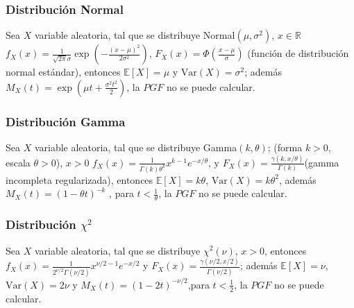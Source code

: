 \subsubsection{Distribuci\'on Normal}

\begin{Def} Sea $X$ variable aleatoria, tal que se distribuye Normal$(\mu,\sigma^{2})$,  $x \in \mathbb{R}$
$f_X(x) =\frac{1}{\sqrt{2\pi}\sigma}\exp\!\left(-\frac{(x-\mu)^{2}}{2\sigma^{2}}\right)$, $F_X(x) =\Phi\!\left(\frac{x-\mu}{\sigma}\right)$ (funci\'on de distribuci\'on normal est\'andar), entonces $\mathbb{E}[X] =\mu$ y $\mathrm{Var}(X) = \sigma^{2}$; adem\'as $M_X(t) = \exp\!\left(\mu t + \frac{\sigma^{2}t^{2}}{2}\right)$,  la $PGF$ no se puede calcular.
\end{Def}

\subsubsection{Distribuci\'on Gamma} 

\begin{Def} Sea $X$ variable aleatoria, tal que se distribuye Gamma$(k,\theta)$; (forma $k>0$, escala $\theta>0$), $x>0$
$f_X(x) = \frac{1}{\Gamma(k)\theta^{k}} x^{k-1} e^{-x/\theta}$, y $F_X(x) = \frac{\gamma\!\left(k, x/\theta\right)}{\Gamma(k)}$(gamma incompleta regularizada), entonces $\mathbb{E}[X] = k\theta$,  $ \mathrm{Var}(X) = k\theta^{2}$, adem\'as $M_X(t) = (1-\theta t)^{-k}$ , para $t<\frac{1}{\theta}$,  la $PGF$ no se puede calcular.
\end{Def}

\subsubsection{Distribuci\'on $\chi^{2}$}

\begin{Def} Sea $X$ variable aleatoria, tal que se distribuye $\chi^{2}(\nu)$, $x > 0$, entonces
$f_X(x) = \frac{1}{2^{\nu/2}\Gamma(\nu/2)} x^{\nu/2 - 1} e^{-x/2}$ y $F_X(x) = \frac{\gamma\!\left(\nu/2, x/2\right)}{\Gamma(\nu/2)}$; adem\'as $\mathbb{E}[X] = \nu$,  $\mathrm{Var}(X) = 2\nu$ y $M_X(t) = (1-2t)^{-\nu/2}$,para $t<\frac{1}{2}$,  la $PGF$ no se puede calcular.
\end{Def}

